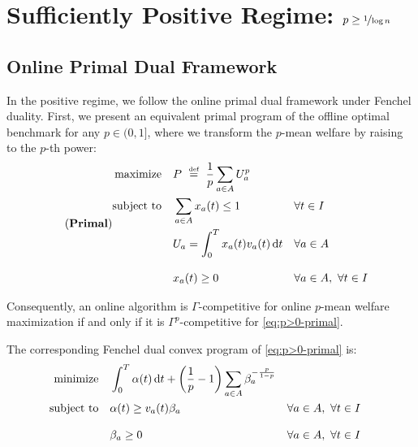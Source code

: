 \documentclass[11pt,letterpaper]{article}
\newcommand{\dif}[1]{\,\text{\rm d} #1}
\newcommand{\utility}{U}
\newcommand{\defeq}{\stackrel{\textrm{\tiny def}}{=}}
\begin{document}
 




\appendix

\section{Sufficiently Positive Regime: $p \ge \nicefrac{1}{\log n}$}
\label{app:positive-regime}
	
\subsection{Online Primal Dual Framework}

In the positive regime, we follow the online primal dual framework under Fenchel duality.
First, we present an equivalent primal program of the offline optimal benchmark for any $p\in (0,1]$, where we transform the $p$-mean welfare by raising to the $p$-th power:
\begin{equation}
\tag{\text{\rm\bf Primal}}
\label{eq:p>0-primal}
\begin{aligned}
	\text{maximize} \quad & P ~\defeq~ \frac{1}{p} \sum_{a\in A} \utility_a^p \\
	\text{subject to} \quad & \sum_{a \in A} x_a(t) \le 1 && \forall t \in I \\
	& \utility_a = \int_0^T x_a(t) v_a(t) \dif{t} && \forall a \in A \\[2ex]
	& x_a(t) \ge 0 && \forall a \in A, ~\forall t \in I
\end{aligned}
\end{equation}

Consequently, an online algorithm is $\Gamma$-competitive for online $p$-mean welfare maximization if and only if it is $\Gamma^p$-competitive for \ref{eq:p>0-primal}.

The corresponding Fenchel dual convex program of \ref{eq:p>0-primal} is:
\begin{align*}
	\text{minimize} \quad & \int_0^T \alpha(t) \dif{t} + \left( \frac{1}{p} - 1 \right) \sum_{a\in A} \beta_a^{-\frac{p}{1-p}} \\
	\text{subject to} \quad & \alpha(t) \geq v_{a}(t)\beta_a && \forall a \in A, ~\forall t \in I \\[2ex]
	& \beta_a \geq 0 && \forall a \in A, ~\forall t \in I
\end{align*}
\end{document}
